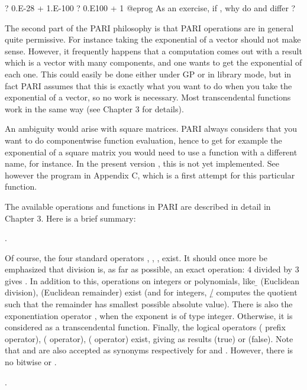\bprog
? 0.E-28 + 1.E-100
? 0.E100 + 1
@eprog
\noindent As an exercise, if , why do  and
 differ ?

The second part of the PARI philosophy is that PARI operations are in general
quite permissive. For instance taking the exponential of a vector should not
make sense. However, it frequently happens that a computation comes out with a
result which is a vector with many components, and one wants to get the
exponential of each one. This could easily be done either under GP or in
library mode, but in fact PARI assumes that this is exactly what you want to
do when you take the exponential of a vector, so no work is necessary. Most
transcendental functions work in the same way (see Chapter 3 for details).

An ambiguity would arise with square matrices. PARI always considers that you
want to do componentwise function evaluation, hence to get for example the
exponential of a square matrix you would need to use a function with a
different name,  for instance. In the present version \vers, this
is not yet implemented. See however the program in Appendix C, which is a
first attempt for this particular function.

The available operations and functions in PARI are described in detail in
Chapter 3. Here is a brief summary:

.

\noindent
Of course, the four standard operators \kbd{+}, \kbd{-}, \kbd{*}, \kbd{/}
exist. It should once more be emphasized that division is, as far as possible,
an exact operation: $4$ divided by $3$ gives . In addition to
this, operations on integers or polynomials, like \b{} (Euclidean
division), \kbd{\%} (Euclidean remainder) exist (and for integers, {\b{/}}
computes the quotient such that the remainder has smallest possible absolute
value). There is also the exponentiation operator \kbd{\pow }, when the
exponent is of type integer. Otherwise, it is considered as a transcendental
function. Finally, the logical operators \kbd{!} ( prefix operator),
\kbd{\&\&} ( operator), \kbd{||} ( operator) exist, giving
as results  (true) or  (false). Note that \kbd{\&} and \kbd{|}
are also accepted as synonyms respectively for \kbd{\&\&} and \kbd{||}.
However, there is no bitwise  or .

.

